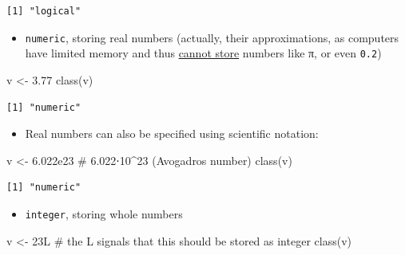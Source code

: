 \documentclass[
  letterpaper,
  DIV=11,
  numbers=noendperiod]{scrreprt}
\newenvironment{Shaded}{\begin{snugshade}}{\end{snugshade}}
\newcommand{\CommentTok}[1]{\textcolor[rgb]{0.37,0.37,0.37}{#1}}
\newcommand{\FloatTok}[1]{\textcolor[rgb]{0.68,0.00,0.00}{#1}}
\newcommand{\FunctionTok}[1]{\textcolor[rgb]{0.28,0.35,0.67}{#1}}
\newcommand{\NormalTok}[1]{\textcolor[rgb]{0.00,0.23,0.31}{#1}}
\newcommand{\OtherTok}[1]{\textcolor[rgb]{0.00,0.23,0.31}{#1}}
\providecommand{\tightlist}{%
  \setlength{\itemsep}{0pt}\setlength{\parskip}{0pt}}\usepackage{longtable,booktabs,array}
\begin{document}
\begin{verbatim}
[1] "logical"
\end{verbatim}

\begin{itemize}
\tightlist
\item
  \texttt{numeric}, storing real numbers (actually, their
  approximations, as computers have limited memory and thus
  \href{https://www.exploringbinary.com/why-0-point-1-does-not-exist-in-floating-point/}{cannot
  store} numbers like π, or even \texttt{0.2})
\end{itemize}

\begin{Shaded}
\begin{Highlighting}[]
\NormalTok{v }\OtherTok{\textless{}{-}} \FloatTok{3.77}
\FunctionTok{class}\NormalTok{(v)}
\end{Highlighting}
\end{Shaded}

\begin{verbatim}
[1] "numeric"
\end{verbatim}

\begin{itemize}
\tightlist
\item
  Real numbers can also be specified using scientific notation:
\end{itemize}

\begin{Shaded}
\begin{Highlighting}[]
\NormalTok{v }\OtherTok{\textless{}{-}} \FloatTok{6.022e23} \CommentTok{\# 6.022⋅10\^{}23 (Avogadro\textquotesingle{}s number)}
\FunctionTok{class}\NormalTok{(v)}
\end{Highlighting}
\end{Shaded}

\begin{verbatim}
[1] "numeric"
\end{verbatim}

\begin{itemize}
\tightlist
\item
  \texttt{integer}, storing whole numbers
\end{itemize}

\begin{Shaded}
\begin{Highlighting}[]
\NormalTok{v }\OtherTok{\textless{}{-}}\NormalTok{ 23L }\CommentTok{\# the L signals that this should be stored as integer}
\FunctionTok{class}\NormalTok{(v)}
\end{Highlighting}
\end{Shaded}
\end{document}

